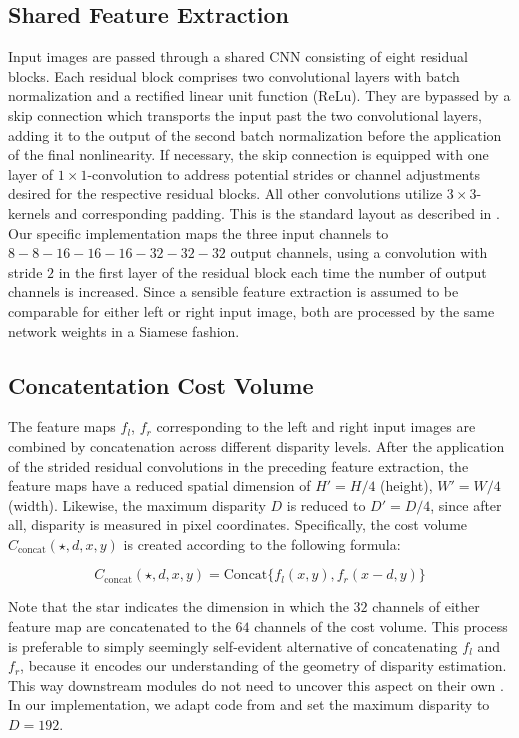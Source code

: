 \documentclass[runningheads]{llncs}
\begin{document}
\subsection{Shared Feature Extraction}
Input images are passed through a shared CNN consisting of eight residual blocks. Each residual block comprises two convolutional layers with batch normalization and a rectified linear unit function (ReLu). They are bypassed by a skip connection which transports the input past the two convolutional layers, adding it to the output of the second batch normalization before the application of the final nonlinearity. If necessary, the skip connection is equipped with one layer of $1 \times 1$-convolution to address potential strides or channel adjustments desired for the respective residual blocks. All other convolutions utilize $3 \times 3$-kernels and corresponding padding. This is the standard layout as described in \cite{ResNet}. Our specific implementation maps the three input channels to $8-8-16-16-16-32-32-32$ output channels, using a convolution with stride $2$ in the first layer of the residual block each time the number of output channels is increased. Since a sensible feature extraction is assumed to be comparable for either left or right input image, both are processed by the same network weights in a Siamese fashion.

\subsection{Concatentation Cost Volume}
The feature maps $f_l$, $f_r$ corresponding to the left and right input images are combined by concatenation across different disparity levels. After the application of the strided residual convolutions in the preceding feature extraction, the feature maps have a reduced spatial dimension of $H'=H/4$ (height), $W'=W/4$ (width). Likewise, the maximum disparity $D$ is reduced to $D'=D/4$, since after all, disparity is measured in pixel coordinates. Specifically, the cost volume $C_{\text{concat}}( \star,d,x,y)$ is created according to the following formula:

\begin{equation}
   C_{\text{concat}}(\star,d,x,y)  = \text{Concat} \{ f_l(x,y), f_r(x-d,y) \}
\end{equation}

Note that the star indicates the dimension in which the $32$ channels of either feature map are concatenated to the $64$ channels of the cost volume. This process is preferable to simply seemingly self-evident alternative of concatenating $f_l$ and $f_r$, because it encodes our understanding of the geometry of disparity estimation. This way downstream modules do not need to uncover this aspect on their own \cite{Cost_Volume}. In our implementation, we adapt code from \cite{GwcGit} and set the maximum disparity to $D=192$.
\end{document}
